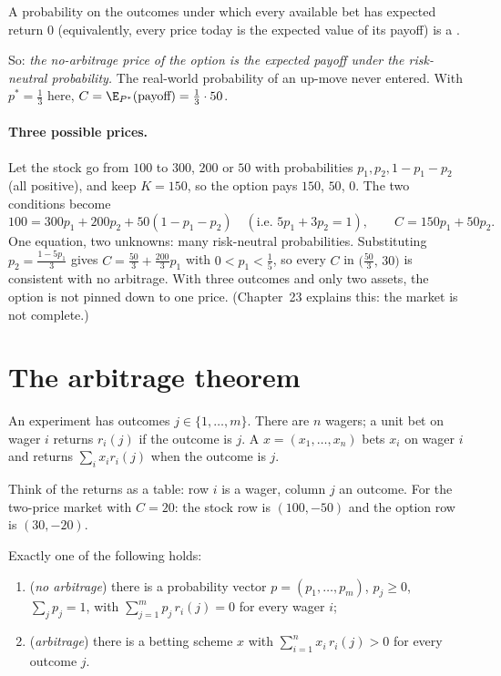 \begin{definition}
A probability on the outcomes under which every available bet has expected return $0$ (equivalently, every price today is the expected value of its payoff) is a .
\end{definition}

So: \emph{the no-arbitrage price of the option is the expected payoff under the risk-neutral probability.} The real-world probability of an up-move never entered. With $p^*=\frac13$ here, $C=\E_{P^*}(\text{payoff})=\frac13\cdot50$.

\paragraph{Three possible prices.} Let the stock go from $100$ to $300$, $200$ or $50$ with probabilities $p_1,p_2,1-p_1-p_2$ (all positive), and keep $K=150$, so the option pays $150$, $50$, $0$. The two conditions become
\[
  100=300p_1+200p_2+50(1-p_1-p_2)\quad(\text{i.e. }5p_1+3p_2=1),\qquad C=150p_1+50p_2 .
\]
One equation, two unknowns: many risk-neutral probabilities. Substituting $p_2=\frac{1-5p_1}{3}$ gives $C=\frac{50}{3}+\frac{200}{3}p_1$ with $0<p_1<\frac15$, so every $C$ in $\big(\frac{50}3,\,30\big)$ is consistent with no arbitrage. With three outcomes and only two assets, the option is not pinned down to one price. (Chapter~23 explains this: the market is not complete.)

\section{The arbitrage theorem}

\begin{setup}
An experiment has outcomes $j\in\{1,\dots,m\}$. There are $n$ wagers; a unit bet on wager $i$ returns $r_i(j)$ if the outcome is $j$. A  $x=(x_1,\dots,x_n)$ bets $x_i$ on wager $i$ and returns $\sum_ix_ir_i(j)$ when the outcome is $j$.
\end{setup}

Think of the returns as a table: row $i$ is a wager, column $j$ an outcome. For the two-price market with $C=20$: the stock row is $(100,-50)$ and the option row is $(30,-20)$.

\begin{theorem}
\label{thm:arbitrage}
Exactly one of the following holds:
\begin{enumerate}[label=(\roman*)]
  \item (\emph{no arbitrage}) there is a probability vector $p=(p_1,\dots,p_m)$, $p_j\ge0$, $\sum_jp_j=1$, with $\displaystyle\sum_{j=1}^mp_j\,r_i(j)=0$ for every wager $i$;
  \item (\emph{arbitrage}) there is a betting scheme $x$ with $\displaystyle\sum_{i=1}^nx_i\,r_i(j)>0$ for every outcome $j$.
\end{enumerate}
\end{theorem}
\noproof

